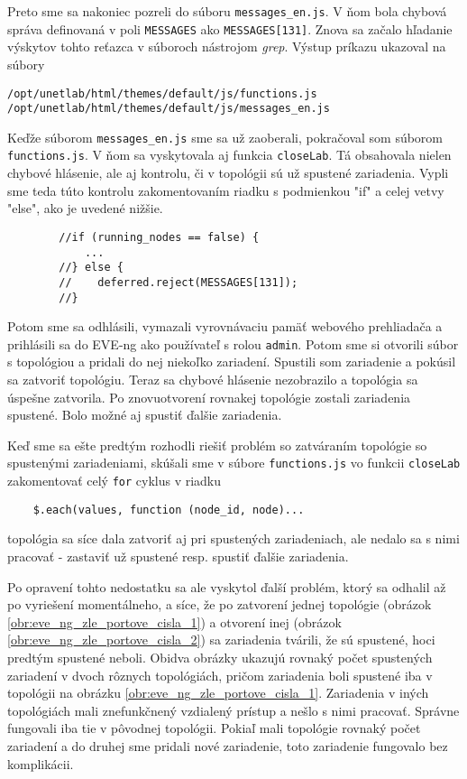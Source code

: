 Preto sme sa nakoniec pozreli do súboru \texttt{messages\_en.js}. V ňom bola chybová správa definovaná v poli \texttt{MESSAGES} ako \texttt{MESSAGES[131]}. Znova sa začalo hľadanie výskytov tohto reťazca v súboroch nástrojom \emph{grep}. Výstup príkazu ukazoval na súbory
\begin{verbatim}
/opt/unetlab/html/themes/default/js/functions.js
/opt/unetlab/html/themes/default/js/messages_en.js
\end{verbatim}

Keďže súborom \texttt{messages\_en.js} sme sa už zaoberali, pokračoval som súborom \texttt{functions.js}. V ňom sa vyskytovala aj funkcia \texttt{closeLab}. Tá obsahovala nielen chybové hlásenie, ale aj kontrolu, či v topológii sú už spustené zariadenia. Vypli sme teda túto kontrolu zakomentovaním riadku s podmienkou "if" a celej vetvy "else", ako je uvedené nižšie.
\begin{verbatim}
        //if (running_nodes == false) {
            ...
        //} else {
        //    deferred.reject(MESSAGES[131]);
        //}
\end{verbatim}

Potom sme sa odhlásili, vymazali vyrovnávaciu pamäť webového prehliadača a prihlásili sa do EVE-ng ako používateľ s rolou \texttt{admin}. Potom sme si otvorili súbor s topológiou a pridali do nej niekoľko zariadení. Spustili som zariadenie a pokúsil sa zatvoriť topológiu. Teraz sa chybové hlásenie nezobrazilo a topológia sa úspešne zatvorila. Po znovuotvorení rovnakej topológie zostali zariadenia spustené. Bolo možné aj spustiť ďalšie zariadenia.

Keď sme sa ešte predtým rozhodli riešiť problém so zatváraním topológie so spustenými zariadeniami, skúšali sme v súbore \texttt{functions.js} vo funkcii \texttt{closeLab} zakomentovať celý \texttt{for} cyklus v riadku 
\begin{verbatim}
    $.each(values, function (node_id, node)...
\end{verbatim}
topológia sa síce dala zatvoriť aj pri spustených zariadeniach, ale nedalo sa s nimi pracovať - zastaviť už spustené resp. spustiť ďalšie zariadenia.

Po opravení tohto nedostatku sa ale vyskytol ďalší problém, ktorý sa odhalil až po vyriešení momentálneho, a síce, že po zatvorení jednej topológie (obrázok \ref{obr:eve_ng_zle_portove_cisla_1}) a otvorení inej (obrázok \ref{obr:eve_ng_zle_portove_cisla_2}) sa zariadenia tvárili, že sú spustené, hoci predtým spustené neboli. Obidva obrázky ukazujú rovnaký počet spustených zariadení v dvoch rôznych topológiách, pričom zariadenia boli spustené iba v topológii na obrázku \ref{obr:eve_ng_zle_portove_cisla_1}. Zariadenia v iných topológiách mali znefunkčnený vzdialený prístup a nešlo s nimi pracovať. Správne fungovali iba tie v pôvodnej topológii. Pokiaľ mali topológie rovnaký počet zariadení a do druhej sme pridali nové zariadenie, toto zariadenie fungovalo bez komplikácii.

